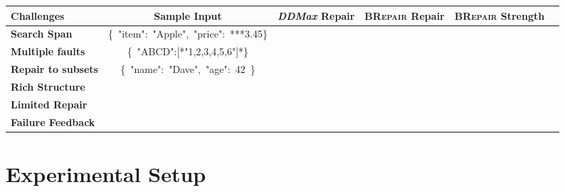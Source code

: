 \documentclass[sigconf,review,anonymous]{acmart}
\newcommand{\approach}{\textsc{BRepair}\xspace}
\newcommand{\ddmax}{\textit{DDMax}\xspace}
\begin{document}
\begin{table*}[!tbp]\centering
\caption{Debugging Richly Structured Inputs: \approach versus \ddmax}
\begin{tabular}{|l | c | r | r | r | r |}
\hline
\textbf{Challenges} & \textbf{Sample Input}  &  \textbf{\ddmax Repair} & \textbf{\approach Repair} & \textbf{\approach Strength}  \\
\hline 
\textbf{Search Span} %
&  \{\ "item":\ "Apple",\ "price":\ ***3.45\} & & & \\ 
\textbf{Multiple faults} & \{\ "ABCD":[*"1,2,3,4,5,6"]*\} & & & \\ 
\textbf{Repair to subsets} & \{\ "name":\ "Dave",\ "age":\ 42\ \} & & & \\ 
\textbf{Rich Structure} & & & & \\ 
\textbf{Limited Repair} & & & & \\ 
\textbf{Failure Feedback} & & & & \\ 
\hline
\end{tabular}
\label{tab:challenges-inp-debug}
\end{table*}


\section{Experimental Setup}
\label{sec:experimental-setup}
\end{document}
